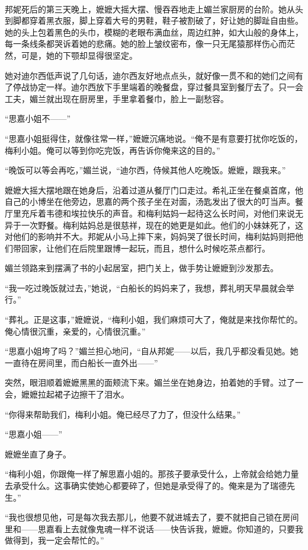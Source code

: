 \par  
\par 邦妮死后的第三天晚上，嬷嬷大摇大摆、慢吞吞地走上媚兰家厨房的台阶。她从头到脚都穿着黑衣服，脚上穿着大号的男鞋，鞋子被割破了，好让她的脚趾自由些。她的头上包着黑色的头巾，模糊的老眼布满血丝，周边红肿，如大山般的身体上，每一条线条都哭诉着她的悲痛。她的脸上皱纹密布，像一只无尾猿那样伤心而茫然，可是，她的下颚却显得很坚定。
\par 她对迪尔西低声说了几句话，迪尔西友好地点点头，就好像一贯不和的她们之间有了停战协定一样。迪尔西放下手里端着的晚餐盘，穿过餐具室到餐厅去了。只一会工夫，媚兰就出现在厨房里，手里拿着餐巾，脸上一副愁容。
\par “思嘉小姐不——”
\par “思嘉小姐挺得住，就像往常一样，”嬷嬷沉痛地说。“俺不是有意要打扰你吃饭的，梅利小姐。俺可以等到你吃完饭，再告诉你俺来这的目的。”
\par “晚饭可以等会再吃，”媚兰说，“迪尔西，侍候其他人吃晚饭。嬷嬷，跟我来。”
\par 嬷嬷大摇大摆地跟在她身后，沿着过道从餐厅门口走过。希礼正坐在餐桌首席，他自己的小博坐在他旁边，思嘉的两个孩子坐在对面，汤匙发出了很大的叮当声。餐厅里充斥着韦德和埃拉快乐的声音。和梅利姑妈一起待这么长时间，对他们来说无异于一次野餐。梅利姑妈总是很慈祥，现在的她更是如此。他们的小妹妹死了，这对他们的影响并不大。邦妮从小马上摔下来，妈妈哭了很长时间，梅利姑妈则把他们带回家，让他们在后院里跟博一起玩，而且，想什么时候吃茶点都行。
\par 媚兰领路来到摆满了书的小起居室，把门关上，做手势让嬷嬷到沙发那去。
\par “我一吃过晚饭就过去，”她说，“白船长的妈妈来了，我想，葬礼明天早晨就会举行。”
\par “葬礼。正是这事，”嬷嬷说，“梅利小姐，我们麻烦可大了，俺就是来找你帮忙的。俺心情很沉重，亲爱的，心情很沉重。”
\par “思嘉小姐垮了吗？”媚兰担心地问，“自从邦妮——以后，我几乎都没看见她。她一直待在房间里，而白船长一直外出——”
\par 突然，眼泪顺着嬷嬷黑黑的面颊流下来。媚兰坐在她身边，拍着她的手臂。过了一会，嬷嬷拉起裙子边擦干了泪水。
\par “你得来帮助我们，梅利小姐。俺已经尽了力了，但没什么结果。”
\par “思嘉小姐——”
\par 嬷嬷坐直了身子。
\par “梅利小姐，你跟俺一样了解思嘉小姐的。那孩子要承受什么，上帝就会给她力量去承受什么。这事确实使她心都要碎了，但她是承受得了的。俺来是为了瑞德先生。”
\par “我也很想见他，可是每次我去那儿，他要不就进城去了，要不就把自己锁在房间里和——思嘉看上去就像鬼魂一样不说话——快告诉我，嬷嬷。你知道的，只要我做得到，我一定会帮忙的。”
